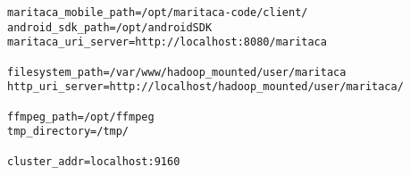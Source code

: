\begin{lstlisting}[style=Bash]
maritaca_mobile_path=/opt/maritaca-code/client/
android_sdk_path=/opt/androidSDK
maritaca_uri_server=http://localhost:8080/maritaca

filesystem_path=/var/www/hadoop_mounted/user/maritaca
http_uri_server=http://localhost/hadoop_mounted/user/maritaca/

ffmpeg_path=/opt/ffmpeg
tmp_directory=/tmp/

cluster_addr=localhost:9160
\end{lstlisting}